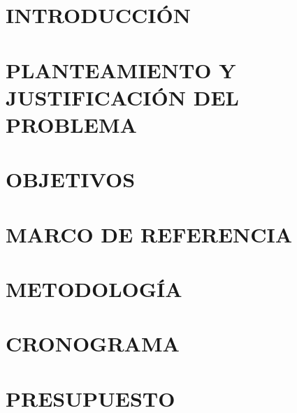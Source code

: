 \documentclass[12pt]{article}
\begin{document}
    
    
    \tableofcontents
    \newpage
    \renewcommand{\numberline}{{Figura}~\oldnumberline }%
    \listoffigures
    \newpage
    \renewcommand{\numberline}{{Tabla}~\oldnumberline }%
    \listoftables
    \newpage
    
    \section{INTRODUCCIÓN}
    
    
    
    \section{PLANTEAMIENTO Y JUSTIFICACIÓN DEL PROBLEMA}
    
    
    \section{OBJETIVOS}
    
    
    \section{MARCO DE REFERENCIA}
    
    
    \section{METODOLOGÍA}
    
    
    \section{CRONOGRAMA}
    
    
    \section{PRESUPUESTO}
    

    
    
\end{document}
